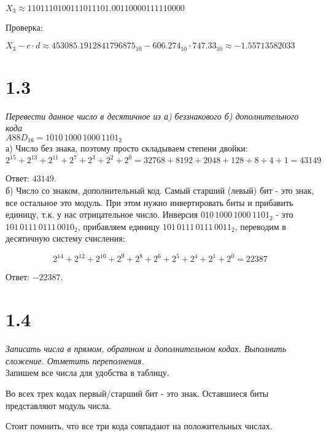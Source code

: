 \documentclass[a4paper,12pt]{article}
\begin{document}
$X_3 \approx 1101110100111011101.00110000111110000$

Проверка:

$X_3 - c \cdot d \approx 453085.1912841796875_{10} - 606.274_{10} \cdot 747.33_{10} \approx -1.55713582033$

\newpage




\section*{1.3}

\textit{Перевести данное число в десятичное из а) беззнакового б) дополнительного кода}
\\

$A88D_{16} = 1010 \, 1000 \, 1000 \, 1101_2$
\\

а) Число без знака, поэтому просто складываем степени двойки:
\[2^{15} + 2^{13} + 2^{11} + 2^7 + 2^3 + 2^2 + 2^0 = 32768 + 8192 + 2048 + 128 + 8 + 4 + 1 = 43149\]

Ответ: $43149$.
\\

б) Число со знаком, дополнительный код.
Самый старший (левый) бит - это знак, все остальное это модуль.
При этом нужно инвертировать биты и прибавить единицу, т.к. у нас отрицательное число.
Инверсия $010 \, 1000 \, 1000 \, 1101_2$ - это $101 \, 0111 \, 0111 \, 0010_2$, прибавляем единицу $101 \, 0111 \, 0111 \, 0011_2$, переводим в десятичную систему счисления:

\[2^{14} + 2^{12} + 2^{10} + 2^9 + 2^8 + 2^6 + 2^5 + 2^4 + 2^1 + 2^0 = 22387\]

Ответ: $-22387$.

\newpage




\section*{1.4}

\textit{Записать числа в прямом, обратном и дополнительном кодах. Выполнить сложение. Отметить переполнения.}
\\

Запишем все числа для удобства в таблицу.

Во всех трех кодах первый/старший бит - это знак.
Оставшиеся биты представляют модуль числа.

Стоит помнить, что все три кода совпадают на положительных числах.
\end{document}
